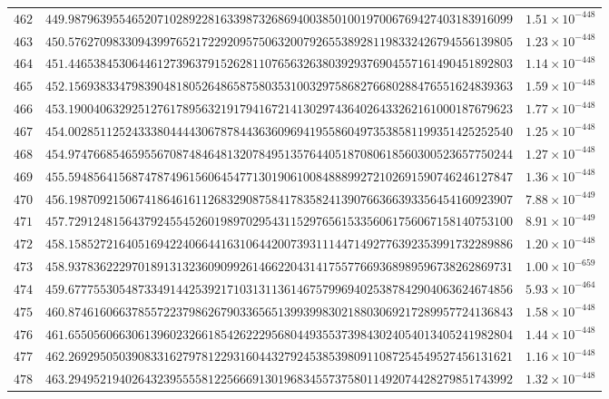 \documentclass[12pt,reqno]{amsart}
\theoremstyle{remark}
\begin{document}
\begin{longtable}{clc}
$462$ & $449.9879639554652071028922816339873268694003850100197006769427403183916099$ & $1.51\times 10^{-448}$ \\
$463$ & $450.5762709833094399765217229209575063200792655389281198332426794556139805$ & $1.23\times 10^{-448}$ \\
$464$ & $451.4465384530644612739637915262811076563263803929376904557161490451892803$ & $1.14\times 10^{-448}$ \\
$465$ & $452.1569383347983904818052648658758035310032975868276680288476551624839363$ & $1.59\times 10^{-448}$ \\
$466$ & $453.1900406329251276178956321917941672141302974364026433262161000187679623$ & $1.77\times 10^{-448}$ \\
$467$ & $454.0028511252433380444430678784436360969419558604973538581199351425252540$ & $1.25\times 10^{-448}$ \\
$468$ & $454.9747668546595567087484648132078495135764405187080618560300523657750244$ & $1.27\times 10^{-448}$ \\
$469$ & $455.5948564156874787496156064547713019061008488899272102691590746246127847$ & $1.36\times 10^{-448}$ \\
$470$ & $456.1987092150674186461611268329087584178358241390766366393356454160923907$ & $7.88\times 10^{-449}$ \\
$471$ & $457.7291248156437924554526019897029543115297656153356061756067158140753100$ & $8.91\times 10^{-449}$ \\
$472$ & $458.1585272164051694224066441631064420073931114471492776392353991732289886$ & $1.20\times 10^{-448}$ \\
$473$ & $458.9378362229701891313236090992614662204314175577669368989596738262869731$ & $1.00\times 10^{-659}$ \\
$474$ & $459.6777553054873349144253921710313113614675799694025387842904063624674856$ & $5.93\times 10^{-464}$ \\
$475$ & $460.8746160663785572237986267903365651399399830218803069217289957724136843$ & $1.58\times 10^{-448}$ \\
$476$ & $461.6550560663061396023266185426222956804493553739843024054013405241982804$ & $1.44\times 10^{-448}$ \\
$477$ & $462.2692950503908331627978122931604432792453853980911087254549527456131621$ & $1.16\times 10^{-448}$ \\
$478$ & $463.2949521940264323955558122566691301968345573758011492074428279851743992$ & $1.32\times 10^{-448}$ \\

\end{longtable}
\end{document}
